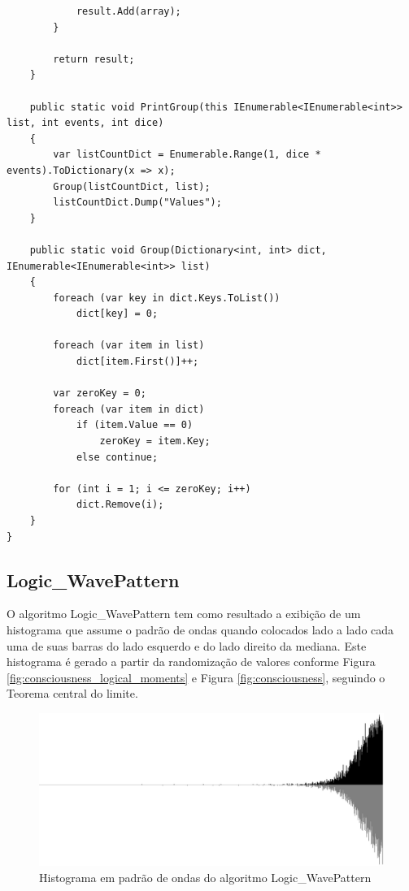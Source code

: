 \begin{apendicesenv}
\begin{lstlisting}
            result.Add(array);
        }

        return result;
    }
    
    public static void PrintGroup(this IEnumerable<IEnumerable<int>> list, int events, int dice)
    {
        var listCountDict = Enumerable.Range(1, dice * events).ToDictionary(x => x);
        Group(listCountDict, list);
        listCountDict.Dump("Values");
    }

    public static void Group(Dictionary<int, int> dict, IEnumerable<IEnumerable<int>> list)
    {
        foreach (var key in dict.Keys.ToList())
            dict[key] = 0;

        foreach (var item in list)
            dict[item.First()]++;

        var zeroKey = 0;
        foreach (var item in dict)
            if (item.Value == 0) 
                zeroKey = item.Key;
            else continue;

        for (int i = 1; i <= zeroKey; i++)
            dict.Remove(i);
    }
}

\end{lstlisting}


\bigbreak \bigbreak
\subsection*{Logic\_WavePattern}
O algoritmo Logic\_WavePattern tem como resultado a exibição de um histograma que assume o padrão de ondas quando colocados lado a lado cada uma de suas barras do lado esquerdo e do lado direito da mediana. Este histograma é gerado a partir da randomização de valores conforme Figura \ref{fig:consciousness_logical_moments} e Figura \ref{fig:consciousness}, seguindo o Teorema central do limite.
\begin{figure}[H]
\caption{Histograma em padrão de ondas do algoritmo Logic\_WavePattern}
\label{fig:logic_wavepattern_15000}
\centering
\includegraphics[scale=.25]{sections/images/logic_wavepattern_15000.jpg}
\end{figure}


\end{apendicesenv}
